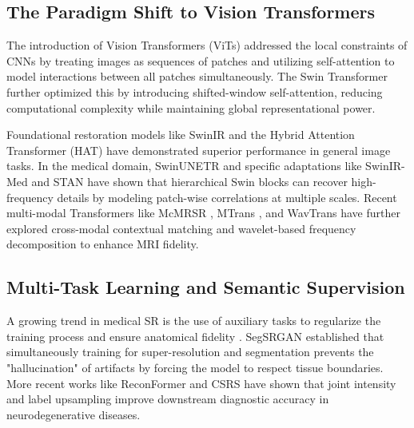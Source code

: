 \documentclass{IEEEoj}
\begin{document}
\subsection{The Paradigm Shift to Vision Transformers}
The introduction of Vision Transformers (ViTs) \cite{Sajol2024, tpami_survey} addressed the local constraints of CNNs by treating images as sequences of patches and utilizing self-attention to model interactions between all patches simultaneously. The Swin Transformer \cite{swin_trans} further optimized this by introducing shifted-window self-attention, reducing computational complexity while maintaining global representational power.

Foundational restoration models like SwinIR \cite{swinir} and the Hybrid Attention Transformer (HAT) \cite{hat} have demonstrated superior performance in general image tasks. In the medical domain, SwinUNETR \cite{SwinUNETR2025} and specific adaptations like SwinIR-Med \cite{swinir_med} and STAN \cite{med_sr_survey} have shown that hierarchical Swin blocks can recover high-frequency details by modeling patch-wise correlations at multiple scales. Recent multi-modal Transformers like McMRSR \cite{mcmrsr_plus}, MTrans \cite{mtrans}, and WavTrans \cite{wavtrans} have further explored cross-modal contextual matching and wavelet-based frequency decomposition to enhance MRI fidelity.

\subsection{Multi-Task Learning and Semantic Supervision}
A growing trend in medical SR is the use of auxiliary tasks to regularize the training process and ensure anatomical fidelity \cite{dense_med, joint_sr_seg_2023}. SegSRGAN \cite{segsrgan} established that simultaneously training for super-resolution and segmentation prevents the "hallucination" of artifacts by forcing the model to respect tissue boundaries. More recent works like ReconFormer \cite{reconformer} and CSRS \cite{joint_sr_seg_2023} have shown that joint intensity and label upsampling improve downstream diagnostic accuracy in neurodegenerative diseases.
\end{document}
